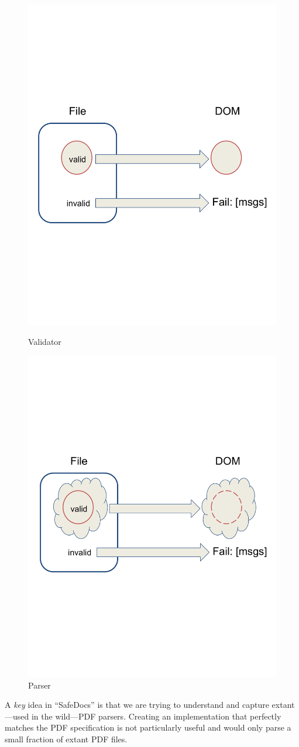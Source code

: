 \begin{figure}[t]
    \centering
    \includegraphics[width=0.50\linewidth]{figures/validator.pdf}
    \caption{Validator}
    \label{fig:validator}
    
    \includegraphics[width=0.50\linewidth]{figures/parser.pdf}
    \caption{Parser}
    \label{fig:parser}
\end{figure}

A \emph{key} idea in ``SafeDocs'' is that we are trying to understand and
capture extant---used in the wild---PDF parsers.  Creating an implementation
that perfectly matches the PDF specification is not particularly useful
and would only parse a small fraction of extant PDF files.


